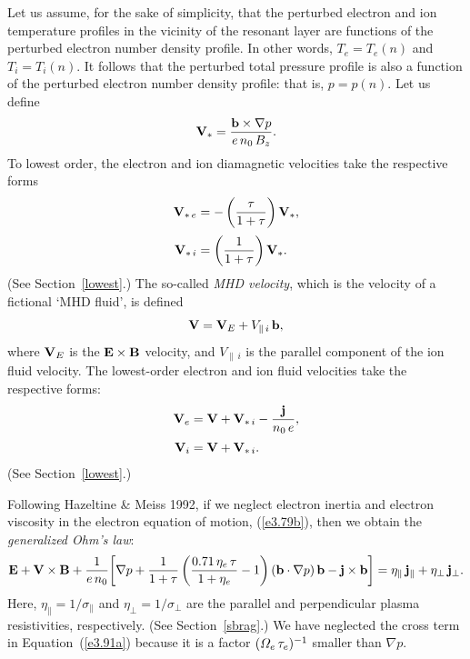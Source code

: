 \documentclass[notitlepage,12pt]{article}
\begin{document}
Let us assume, for the sake of simplicity, that the perturbed electron and ion temperature profiles in the vicinity of the resonant
layer are functions of the perturbed electron number density profile. In other words, $T_e=T_e(n)$ and $T_i=T_i(n)$. 
It follows that the perturbed total pressure profile is also a function of the perturbed electron number density profile: that is,
$p=p(n)$. Let us define
\begin{equation}
{\bf V}_\ast = \frac{{\bf b}\times \nabla p}{e\,n_0\,B_z}.
\end{equation}
To lowest order, the electron and ion diamagnetic velocities take the respective forms
\begin{align}
{\bf V}_{\ast\,e} &= -\left(\frac{\tau}{1+\tau}\right){\bf V}_\ast,\\[0.5ex]
{\bf V}_{\ast\,i} &= \left(\frac{1}{1+\tau}\right){\bf V}_\ast.
\end{align}
(See Section~\ref{lowest}.)
The so-called {\em MHD velocity}, which is the velocity of a fictional `MHD fluid',  is defined
\begin{equation}\label{e217}
{\bf V} = {\bf V}_E + V_{\parallel\,i}\,{\bf b},
\end{equation}
where ${\bf V}_E$ is the ${\bf E}\times {\bf B}$ velocity, and $V_{\parallel\,i}$ is the parallel component of the ion
fluid velocity. The lowest-order electron and ion fluid velocities take the respective forms:
\begin{align}
{\bf V}_e &= {\bf V} +{\bf V}_{\ast\,i}-\frac{{\bf j}}{n_0\,e},\\[0.5ex]
{\bf V}_i &= {\bf V} + {\bf V}_{\ast\,i}.
\end{align}
(See Section~\ref{lowest}.)

Following Hazeltine \& Meiss 1992, if we neglect electron inertia and electron viscosity  in the electron equation of motion, (\ref{e3.79b}), then
we obtain the {\em generalized Ohm's law}: 
\begin{equation}\label{e220}
{\bf E} + {\bf V}\times {\bf B} + \frac{1}{e\,n_0}\!\left[\nabla p + \frac{1}{1+\tau}\left(\frac{0.71\,\eta_e\,\tau}{1+\eta_e}-1\right)({\bf b}\cdot\nabla p)\,{\bf b} -{\bf j}\times{\bf b}\right] = \eta_\parallel\,{\bf j}_\parallel + \eta_\perp\,{\bf j}_\perp.
\end{equation}
Here, $\eta_\parallel=1/\sigma_\parallel$ and $\eta_\perp=1/\sigma_\perp$ are the parallel and perpendicular plasma
resistivities,  respectively. (See Section~\ref{sbrag}.) We have neglected the cross term in Equation~(\ref{e3.91a})
because it is a factor $({\mit\Omega}_e\,\tau_e)^{-1}$  smaller than $\nabla p$. 
\end{document}
